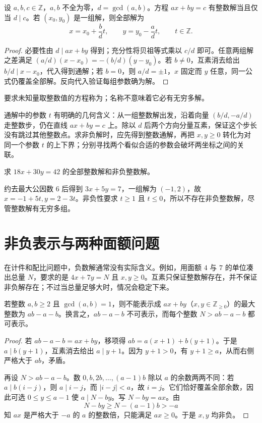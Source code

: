 \documentclass[UTF8,12pt,a4paper,fontset=fandol]{ctexbook}
\begin{document}
\begin{theorem}[一次不定方程]
\label{thm:linear-diophantine}
设 $a,b,c\in\mathbb Z$，$a,b$ 不全为零，$d=\gcd(a,b)$。方程 $ax+by=c$ 有整数解当且仅当 $d\mid c$。若 $(x_0,y_0)$ 是一组解，则全部解为
\begin{equation}
 x=x_0+\frac bd t,\qquad y=y_0-\frac ad t,\qquad t\in\mathbb Z.
 \label{eq:linear-diophantine-solutions}
\end{equation}
\end{theorem}
\begin{proof}
必要性由 $d\mid ax+by$ 得到；充分性将贝祖等式乘以 $c/d$ 即可。任意两组解之差满足 $(a/d)(x-x_0)=-(b/d)(y-y_0)$。若 $b\ne0$，互素消去给出 $b/d\mid x-x_0$，代入得到通解；若 $b=0$，则 $a/d=\pm1$，$x$ 固定而 $y$ 任意，同一公式仍覆盖全部解。反向代入验证每组参数确为解。
\end{proof}

要求未知量取整数值的方程称为；名称不意味着它必有无穷多解。

通解中的参数 $t$ 有明确的几何含义：从一组整数解出发，沿着向量 $(b/d,-a/d)$ 走整数步，仍在直线 $ax+by=c$ 上。除以 $d$ 后两个方向分量互素，保证这个步长没有跳过其他整数点。求非负解时，应先得到整数通解，再把 $x,y\ge0$ 转化为对同一个参数 $t$ 的上下界；分别寻找两个看似合适的参数会破坏两坐标之间的关联。

\begin{example}
求 $18x+30y=42$ 的全部整数解和非负整数解。
\end{example}
\begin{solve}
约去最大公因数 $6$ 后得到 $3x+5y=7$，一组解为 $(-1,2)$，故 $x=-1+5t,y=2-3t$。非负性要求 $t\ge1$ 且 $t\le0$，所以不存在非负整数解，尽管整数解有无穷多组。
\end{solve}

\section{非负表示与两种面额问题}

在计件和配比问题中，负数解通常没有实际含义。例如，用面额 $4$ 与 $7$ 的单位凑出总量 $N$，要求的是 $4x+7y=N$ 且 $x,y\ge0$。互素只保证整数解存在，并不保证非负解存在；不过当总量足够大时，情况会稳定下来。

\begin{theorem}[两种面额的最大不可表示数]
\label{thm:two-coins}
若整数 $a,b\ge2$ 且 $\gcd(a,b)=1$，则不能表示成 $ax+by$（$x,y\in\mathbb Z_{\ge0}$）的最大整数为 $ab-a-b$。换言之，$ab-a-b$ 不可表示，而每个整数 $N>ab-a-b$ 都可表示。
\end{theorem}
\begin{proof}
若 $ab-a-b=ax+by$，移项得 $ab=a(x+1)+b(y+1)$。于是 $a\mid b(y+1)$，互素消去给出 $a\mid y+1$。因为 $y+1>0$，有 $y+1\ge a$，从而右侧严格大于 $ab$，矛盾。

再设 $N>ab-a-b$。数 $0,b,2b,\ldots,(a-1)b$ 除以 $a$ 的余数两两不同：若 $a\mid b(i-j)$，则 $a\mid i-j$，而 $|i-j|<a$，故 $i=j$。它们恰好覆盖全部余数，因此可选 $0\le y\le a-1$ 使 $a\mid N-by$。写 $N-by=ax$。由
\[
 N-by\ge N-(a-1)b>-a
\]
知 $ax$ 是严格大于 $-a$ 的 $a$ 的整数倍，只能满足 $ax\ge0$。于是 $x,y$ 均非负。
\end{proof}
\end{document}
